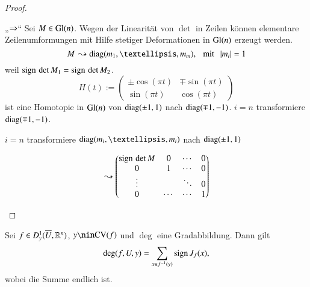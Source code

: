 \begin{proof}
    \begin{description}
    \item{„$\Rightarrow$“} Sei $M\in \mathrm{Gl}(n)$. Wegen der Linearität von $\det $ in Zeilen können elementare
    Zeilenumformungen mit Hilfe stetiger Deformationen in $\mathrm{Gl}(n)$ erzeugt werden.
    \[
        M \, \leadsto\diag(m_1,…,m_m), \qq \text{mit} \qq |m_i|=1
    \]
    weil $\mathrm{sign}\, \det M_1=\mathrm{sign}\, \det M_2$.
    \[
        H(t):= \begin{pmatrix} \pm \cos (\pi t)& \mp \sin(\pi t)\\ \sin(\pi t) & \cos(\pi t)\end{pmatrix}
    \]
    ist eine Homotopie in $\mathrm{Gl}(n)$ von $\mathrm{diag}(\pm 1,1)$ nach $\mathrm{diag}(\mp 1,-1)$. $i=n$ transformiere
    $\mathrm{diag}(\mp 1,-1)$.

    \noindent $i=n$ transformiere $\diag(m_i,…,m_i)$ nach $\mathrm{diag}(\pm1,1)$

    \[
        \leadsto \begin{pmatrix} \mathrm{sign}\,\det M& 0& \cdots&0\\ 0& 1 &\cdots&0\\\vdots&&\ddots&0\\ 0&\cdots&
        \cdots& 1\end{pmatrix}
    \]

    \end{description}
\end{proof}

\begin{theorem}
    Sei $f\in D_y^1(\overline U, \mathbb{R}^n)$, $y\nin \CV(f)$ und $\deg$ eine Gradabbildung. Dann gilt
    \[
        \deg(f,U,y)=\sum_{x\in f^{-1}(y)} \mathrm{sign}\, J_f(x),
    \]
    wobei die Summe endlich ist.
\end{theorem}

